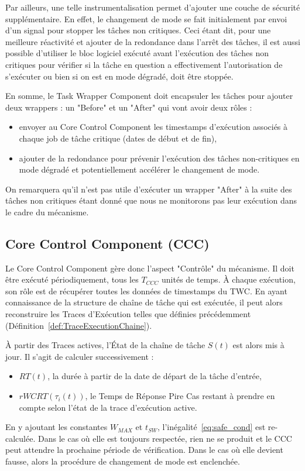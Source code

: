 \documentclass[french, a4paper, 11pt, twoside, pdftex]{StyleThese}
\begin{document}
        Par ailleurs, une telle instrumentalisation permet d'ajouter une couche de sécurité supplémentaire. En effet, le changement de mode se fait initialement par envoi d'un signal pour stopper les tâches non critiques. Ceci étant dit, pour une meilleure réactivité et ajouter de la redondance dans l'arrêt des tâches, il est aussi possible d'utiliser le bloc logiciel exécuté avant l'exécution des tâches non critiques pour vérifier si la tâche en question a effectivement l'autorisation de s'exécuter ou bien si on est en mode dégradé, doit être stoppée. 
        
        En somme, le Task Wrapper Component doit encapsuler les tâches pour ajouter deux wrappers : un "Before" et un "After" qui vont avoir deux rôles : 
        \begin{itemize}
        	\item envoyer au Core Control Component les timestamps d'exécution associés à chaque job de tâche critique (dates de début et de fin),
        	\item ajouter de la redondance pour prévenir l'exécution des tâches non-critiques en mode dégradé et potentiellement accélérer le changement de mode.
        \end{itemize}
		On remarquera qu'il n'est pas utile d'exécuter un wrapper "After" à la suite des tâches non critiques étant donné que nous ne monitorons pas leur exécution dans le cadre du mécanisme.

        \subsection{Core Control Component (CCC)}
        
        Le Core Control Component gère donc l'aspect "Contrôle" du mécanisme. Il doit être exécuté périodiquement, tous les $T_{CCC}$ unités de temps. À chaque exécution, son rôle est de récupérer toutes les données de timestamps du TWC. En ayant connaissance de la structure de chaîne de tâche qui est exécutée, il peut alors reconstruire les Traces d'Exécution telles que définies précédemment (Définition~\ref{def:TraceExecutionChaine}). 
        
        À partir des Traces actives, l'État de la chaîne de tâche $S(t)$ est alors mis à jour. Il s'agit de calculer successivement : 
        \begin{itemize}
        	\item $RT(t)$, la durée à partir de la date de départ de la tâche d'entrée,
        	\item $rWCRT(\tau_i(t))$, le Temps de Réponse Pire Cas restant à prendre en compte selon l'état de la trace d'exécution active.
        \end{itemize} 
	    En y ajoutant les constantes $W_{MAX}$ et $t_{SW}$, l'inégalité~\ref{eq:safe_cond} est re-calculée.
        Dans le cas où elle est toujours respectée, rien ne se produit et le CCC peut attendre la prochaine période de vérification. Dans le cas où elle devient fausse, alors la procédure de changement de mode est enclenchée. %
                
\end{document}
